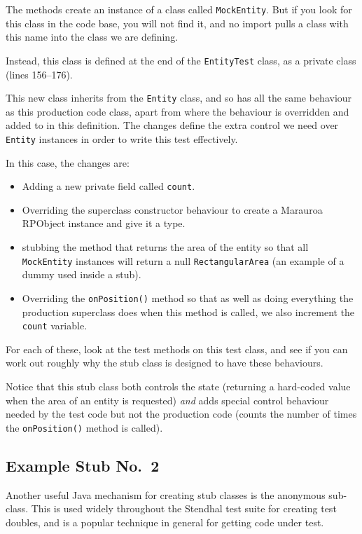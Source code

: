 \documentclass[
]{book}
\providecommand{\tightlist}{%
  \setlength{\itemsep}{0pt}\setlength{\parskip}{0pt}}
\begin{document}
The methods create an instance of a class called \texttt{MockEntity}. But if you look for this class in the code base, you will not find it, and no import pulls a class with this name into the class we are defining.

Instead, this class is defined at the end of the \texttt{EntityTest} class, as a private class (lines 156--176).

This new class inherits from the \texttt{Entity} class, and so has all the same behaviour as this production code class, apart from where the behaviour is overridden and added to in this definition. The changes define the extra control we need over \texttt{Entity} instances in order to write this test effectively.

In this case, the changes are:

\begin{itemize}
\tightlist
\item
  Adding a new private field called \texttt{count}.
\item
  Overriding the superclass constructor behaviour to create a Marauroa RPObject instance and give it a type.
\item
  stubbing the method that returns the area of the entity so that all \texttt{MockEntity} instances will return a null \texttt{RectangularArea} (an example of a dummy used inside a stub).
\item
  Overriding the \texttt{onPosition()} method so that as well as doing everything the production superclass does when this method is called, we also increment the \texttt{count} variable.
\end{itemize}

For each of these, look at the test methods on this test class, and see if you can work out roughly why the stub class is designed to have these behaviours.

Notice that this stub class both controls the state (returning a hard-coded value when the area of an entity is requested) \emph{and} adds special control behaviour needed by the test code but not the production code (counts the number of times the \texttt{onPosition()} method is called).

\hypertarget{stubby2}{%
\subsection{Example Stub No.~2}\label{stubby2}}

Another useful Java mechanism for creating stub classes is the anonymous sub-class. This is used widely throughout the Stendhal test suite for creating test doubles, and is a popular technique in general for getting code under test.
\end{document}
